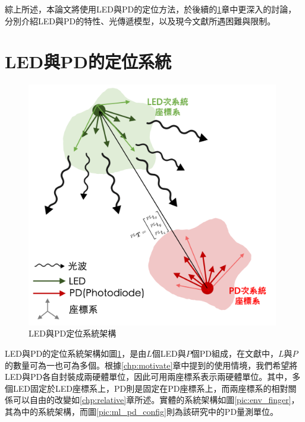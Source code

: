         
        綜上所述，本論文將使用LED與PD的定位方法，於後續的\ref{chp:LEDandPD}章中更深入的討論，分別介紹LED與PD的特性、光傳遞模型，以及現今文獻所遇困難與限制。


        

    

        

        

        

        


        

        

            

          
\section{LED與PD的定位系統}
\label{chp:LEDandPD}




\begin{figure}[htpb]
    \centering
    \includegraphics[width=11cm]{ch2pic/lp_system_structure.png}
    \caption{LED與PD定位系統架構}
    \label{pic:lp_system_structure}
\end{figure}




LED與PD的定位系統架構如圖\ref{pic:lp_system_structure}，是由$L$個LED與$P$個PD組成，在文獻中，$L$與$P$的數量可為一也可為多個。根據\ref{chp:motivate}章中提到的使用情境，我們希望將LED與PD各自封裝成兩硬體單位，因此可用兩座標系表示兩硬體單位。其中，多個LED固定於LED座標系上，PD則是固定在PD座標系上，而兩座標系的相對關係可以自由的改變如\ref{chp:relative}章所述。實體的系統架構如圖\ref{pic:env_finger}，其為\cite{case:ml}中的系統架構，而圖\ref{pic:ml_pd_config}則為該研究中的PD量測單位。

